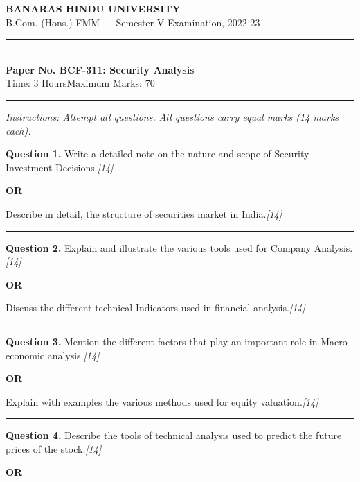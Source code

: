 \documentclass[11pt,a4paper]{article}
\newcommand{\pts}[1]{\hfill   \textit{[#1]}}
\begin{document}
\begin{center}
  {\large\bfseries BANARAS HINDU UNIVERSITY}\\[2pt]
  {\normalsize B.Com. (Hons.) FMM --- Semester V Examination, 2022-23}\\[6pt]
  \rule{0.8\linewidth}{0.5pt}\\[6pt]
  {\large\bfseries Paper No. BCF-311: Security Analysis}\\[4pt]
  {\normalsize Time: 3 Hours\hfill Maximum Marks: 70}
\end{center}

\rule{\linewidth}{0.4pt}

\smallskip



\noindent   \textit{Instructions: Attempt all questions. All questions carry equal marks (14 marks each).}

\bigskip




\noindent   \textbf{Question 1.}
Write a detailed note on the nature and scope of Security Investment Decisions.\pts{14}

\centerline{   \textbf{OR}}

Describe in detail, the structure of securities market in India.\pts{14}

\medskip\rule{\linewidth}{0.2pt}




\noindent   \textbf{Question 2.}
Explain and illustrate the various tools used for Company Analysis.\pts{14}

\centerline{   \textbf{OR}}

Discuss the different technical Indicators used in financial analysis.\pts{14}

\medskip\rule{\linewidth}{0.2pt}




\noindent   \textbf{Question 3.}
Mention the different factors that play an important role in Macro economic analysis.\pts{14}

\centerline{   \textbf{OR}}

Explain with examples the various methods used for equity valuation.\pts{14}

\medskip\rule{\linewidth}{0.2pt}




\noindent   \textbf{Question 4.}
Describe the tools of technical analysis used to predict the future prices of the stock.\pts{14}

\centerline{   \textbf{OR}}
\end{document}

